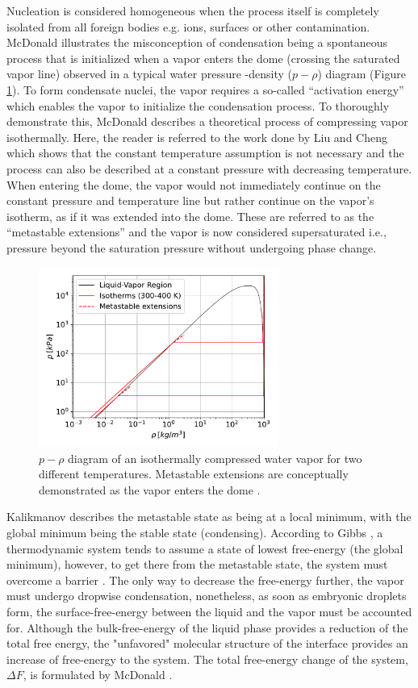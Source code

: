 \documentclass[12pt]{article}
\numberwithin{equation}{section}
\begin{document}
Nucleation is considered homogeneous when the process itself is completely isolated from all foreign bodies e.g. ions, surfaces or other contamination.
McDonald \cite{mcdonald1962homogeneous} illustrates the misconception of condensation being a spontaneous process that is initialized when a vapor enters the dome (crossing the saturated vapor line) observed in a typical water pressure -density ($p-\rho$) diagram (Figure \ref{f:metastable}). To form condensate nuclei, the vapor requires a so-called “activation energy” which enables the vapor to initialize the condensation process. To thoroughly demonstrate this, McDonald describes a theoretical process of compressing vapor isothermally. Here, the reader is referred to the work done by Liu and Cheng \cite{liu2015dropwise} which shows that the constant temperature assumption is not necessary and the process can also be described at a constant pressure with decreasing temperature. When entering the dome, the vapor would not immediately continue on the constant pressure and temperature line but rather continue on the vapor's isotherm, as if it was extended into the dome. These are referred to as the “metastable extensions” and the vapor is now considered supersaturated i.e., pressure beyond the saturation pressure without undergoing phase change.
\begin{figure}[H]
    \centering
    \includegraphics[width=0.7\textwidth]{Figures/metastable_ext.pdf}
    \caption{$p-\rho$ diagram of an isothermally compressed water vapor for two different temperatures. Metastable extensions are conceptually demonstrated as the vapor enters the dome \cite{doi:10.1021/ie4033999}.}
    \label{f:metastable}
\end{figure}
Kalikmanov \cite{kalikmanov2013computer} describes the metastable state as being at a local minimum, with the global minimum being the stable state (condensing). According to Gibbs \cite{gibbs1957method}, a thermodynamic system tends to assume a state of lowest free-energy (the global minimum), however, to get there from the metastable state, the system must overcome a barrier \cite{mcdonald1962homogeneous}. The only way to decrease the free-energy further, the vapor must undergo dropwise condensation, nonetheless, as soon as embryonic droplets form, the surface-free-energy between the liquid and the vapor must be accounted for. Although the bulk-free-energy of the liquid phase provides a reduction of the total free energy, the "unfavored" molecular structure of the interface provides an increase of free-energy to the system. The total free-energy change of the system, $\Delta F$, is formulated by McDonald \cite{mcdonald1962homogeneous}.
\end{document}
